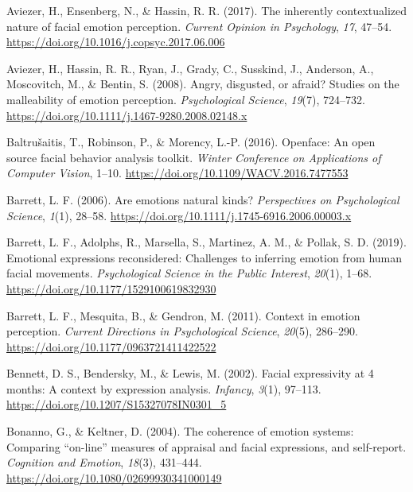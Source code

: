 \documentclass[
  english,
  man]{apa7}
\newlength{\cslhangindent}
\newenvironment{cslreferences}%
  {\setlength{\parindent}{0pt}%
  \everypar{\setlength{\hangindent}{\cslhangindent}}\ignorespaces}%
  {\par}
\begin{document}
\begin{cslreferences}
\leavevmode\hypertarget{ref-aviezer2017inherently}{}%
Aviezer, H., Ensenberg, N., \& Hassin, R. R. (2017). The inherently contextualized nature of facial emotion perception. \emph{Current Opinion in Psychology}, \emph{17}, 47--54. \url{https://doi.org/10.1016/j.copsyc.2017.06.006}

\leavevmode\hypertarget{ref-aviezer2008angry}{}%
Aviezer, H., Hassin, R. R., Ryan, J., Grady, C., Susskind, J., Anderson, A., Moscovitch, M., \& Bentin, S. (2008). Angry, disgusted, or afraid? Studies on the malleability of emotion perception. \emph{Psychological Science}, \emph{19}(7), 724--732. \url{https://doi.org/10.1111/j.1467-9280.2008.02148.x}

\leavevmode\hypertarget{ref-baltruvsaitis2016openface}{}%
Baltrušaitis, T., Robinson, P., \& Morency, L.-P. (2016). Openface: An open source facial behavior analysis toolkit. \emph{Winter Conference on Applications of Computer Vision}, 1--10. \url{https://doi.org/10.1109/WACV.2016.7477553}

\leavevmode\hypertarget{ref-barrett2006emotions}{}%
Barrett, L. F. (2006). Are emotions natural kinds? \emph{Perspectives on Psychological Science}, \emph{1}(1), 28--58. \url{https://doi.org/10.1111/j.1745-6916.2006.00003.x}

\leavevmode\hypertarget{ref-barrett2019emotional}{}%
Barrett, L. F., Adolphs, R., Marsella, S., Martinez, A. M., \& Pollak, S. D. (2019). Emotional expressions reconsidered: Challenges to inferring emotion from human facial movements. \emph{Psychological Science in the Public Interest}, \emph{20}(1), 1--68. \url{https://doi.org/10.1177/1529100619832930}

\leavevmode\hypertarget{ref-barrett2011context}{}%
Barrett, L. F., Mesquita, B., \& Gendron, M. (2011). Context in emotion perception. \emph{Current Directions in Psychological Science}, \emph{20}(5), 286--290. \url{https://doi.org/10.1177/0963721411422522}

\leavevmode\hypertarget{ref-bennett2002facial}{}%
Bennett, D. S., Bendersky, M., \& Lewis, M. (2002). Facial expressivity at 4 months: A context by expression analysis. \emph{Infancy}, \emph{3}(1), 97--113. \url{https://doi.org/10.1207/S15327078IN0301_5}

\leavevmode\hypertarget{ref-bonanno2004brief}{}%
Bonanno, G., \& Keltner, D. (2004). The coherence of emotion systems: Comparing ``on-line'' measures of appraisal and facial expressions, and self-report. \emph{Cognition and Emotion}, \emph{18}(3), 431--444. \url{https://doi.org/10.1080/02699930341000149}


\end{cslreferences}
\end{document}

